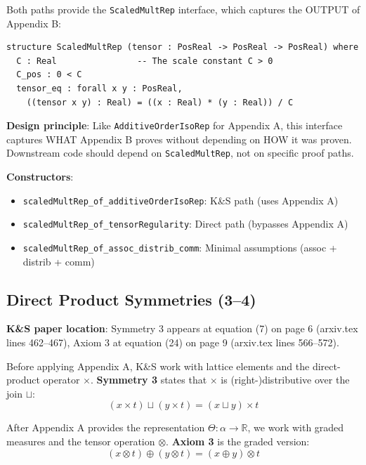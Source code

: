 \documentclass[11pt]{article}
\theoremstyle{definition}
\theoremstyle{remark}
\begin{document}
Both paths provide the \texttt{ScaledMultRep} interface, which captures the OUTPUT of Appendix B:

\begin{lstlisting}[caption={ScaledMultRep interface (\href{https://github.com/zariuq/ks-foundations-of-inference/blob/main/KnuthSkilling/Multiplicative/ScaledMultRep.lean}{Multiplicative/ScaledMultRep.lean})},numbers=none]
structure ScaledMultRep (tensor : PosReal -> PosReal -> PosReal) where
  C : Real                -- The scale constant C > 0
  C_pos : 0 < C
  tensor_eq : forall x y : PosReal,
    ((tensor x y) : Real) = ((x : Real) * (y : Real)) / C
\end{lstlisting}

\textbf{Design principle}: Like \texttt{AdditiveOrderIsoRep} for Appendix A, this interface captures
WHAT Appendix B proves without depending on HOW it was proven. Downstream code should depend on
\texttt{ScaledMultRep}, not on specific proof paths.

\textbf{Constructors}:
\begin{itemize}
\item \texttt{scaledMultRep\_of\_additiveOrderIsoRep}: K\&S path (uses Appendix A)
\item \texttt{scaledMultRep\_of\_tensorRegularity}: Direct path (bypasses Appendix A)
\item \texttt{scaledMultRep\_of\_assoc\_distrib\_comm}: Minimal assumptions (assoc + distrib + comm)
\end{itemize}

\subsection{Direct Product Symmetries (3--4)}

\textbf{K\&S paper location}: Symmetry 3 appears at equation (7) on page 6 (arxiv.tex lines 462--467),
Axiom 3 at equation (24) on page 9 (arxiv.tex lines 566--572).

Before applying Appendix A, K\&S work with lattice elements and the direct-product operator $\times$.
\textbf{Symmetry 3} states that $\times$ is (right-)distributive over the join $\sqcup$:
\[ (x \times t) \sqcup (y \times t) = (x \sqcup y) \times t \]

After Appendix A provides the representation $\Theta : \alpha \to \mathbb{R}$, we work with
graded measures and the tensor operation $\otimes$. \textbf{Axiom 3} is the graded version:
\[ (x \otimes t) \oplus (y \otimes t) = (x \oplus y) \otimes t \]
\end{document}
